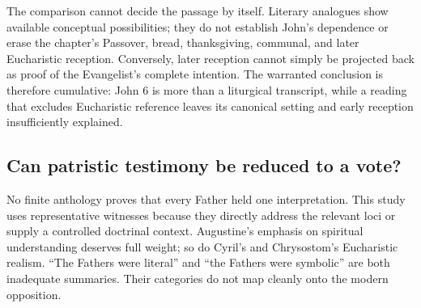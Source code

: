 The comparison cannot decide the passage by itself. Literary analogues show
available conceptual possibilities; they do not establish John's dependence or
erase the chapter's Passover, bread, thanksgiving, communal, and later
Eucharistic reception. Conversely, later reception cannot simply be projected
back as proof of the Evangelist's complete intention. The warranted conclusion
is therefore cumulative: John 6 is more than a liturgical transcript, while a
reading that excludes Eucharistic reference leaves its canonical setting and
early reception insufficiently explained.

\subsection{Can patristic testimony be reduced to a vote?}

No finite anthology proves that every Father held one interpretation. This
study uses representative witnesses because they directly address the relevant
loci or supply a controlled doctrinal context. Augustine's emphasis on
spiritual understanding deserves full weight; so do Cyril's and
Chrysostom's Eucharistic realism. ``The Fathers were literal'' and ``the
Fathers were symbolic'' are both inadequate summaries. Their categories do not
map cleanly onto the modern opposition.

